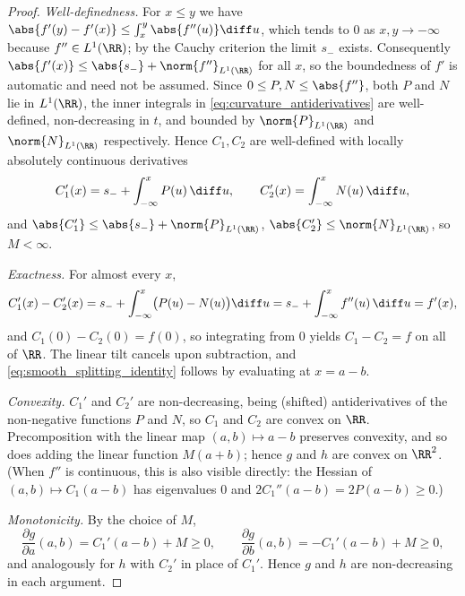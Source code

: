 \begin{proof}
\emph{Well-definedness.}
For $x \le y$ we have $\abs{f'(y) - f'(x)} \le \int_x^y \abs{f''(u)} \diff u$, which tends to $0$ as $x, y \to -\infty$ because $f'' \in L^1(\RR)$; by the Cauchy criterion the limit $s_-$ exists. Consequently $\abs{f'(x)} \le \abs{s_-} + \norm{f''}_{L^1(\RR)}$ for all $x$, so the boundedness of $f'$ is automatic and need not be assumed. Since $0 \le P, N \le \abs{f''}$, both $P$ and $N$ lie in $L^1(\RR)$, the inner integrals in \eqref{eq:curvature_antiderivatives} are well-defined, non-decreasing in $t$, and bounded by $\norm{P}_{L^1(\RR)}$ and $\norm{N}_{L^1(\RR)}$ respectively. Hence $C_1, C_2$ are well-defined with locally absolutely continuous derivatives
\begin{equation*}
	C_1'(x) = s_- + \int_{-\infty}^{x} P(u) \,\diff u,
	\qquad
	C_2'(x) = \int_{-\infty}^{x} N(u) \,\diff u,
\end{equation*}
and $\abs{C_1'} \le \abs{s_-} + \norm{P}_{L^1(\RR)}$, $\abs{C_2'} \le \norm{N}_{L^1(\RR)}$, so $M < \infty$.

\emph{Exactness.}
For almost every $x$,
\begin{equation*}
	C_1'(x) - C_2'(x) = s_- + \int_{-\infty}^{x} \bigl( P(u) - N(u) \bigr) \diff u = s_- + \int_{-\infty}^{x} f''(u) \,\diff u = f'(x),
\end{equation*}
and $C_1(0) - C_2(0) = f(0)$, so integrating from $0$ yields $C_1 - C_2 = f$ on all of $\RR$. The linear tilt cancels upon subtraction, and \eqref{eq:smooth_splitting_identity} follows by evaluating at $x = a - b$.

\emph{Convexity.}
$C_1'$ and $C_2'$ are non-decreasing, being (shifted) antiderivatives of the non-negative functions $P$ and $N$, so $C_1$ and $C_2$ are convex on $\RR$. Precomposition with the linear map $(a,b) \mapsto a - b$ preserves convexity, and so does adding the linear function $M(a+b)$; hence $g$ and $h$ are convex on $\RR^2$. (When $f''$ is continuous, this is also visible directly: the Hessian of $(a,b) \mapsto C_1(a-b)$ has eigenvalues $0$ and $2 C_1''(a-b) = 2P(a-b) \ge 0$.)

\emph{Monotonicity.}
By the choice of $M$,
\begin{equation*}
	\frac{\partial g}{\partial a}(a,b) = C_1'(a-b) + M \ge 0,
	\qquad
	\frac{\partial g}{\partial b}(a,b) = -C_1'(a-b) + M \ge 0,
\end{equation*}
and analogously for $h$ with $C_2'$ in place of $C_1'$. Hence $g$ and $h$ are non-decreasing in each argument.
\end{proof}

